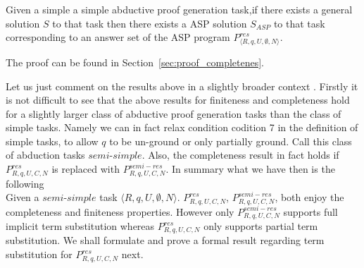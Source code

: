 
\begin{theorem}[Completeness]\label{thm:completeness}
  Given a simple a simple abductive proof generation task,if there exists a general solution $S$ to that task then there
  exists a ASP solution $S_{ASP}$ to that task corresponding to an answer set of the ASP program $P_{\langle R,q,U,\emptyset,N\rangle}^{res}$.
\end{theorem}

The proof can be found in Section~\ref{sec:proof_completenes}.

Let us just comment on the results above in a slightly broader context . Firstly it is not difficult to see that the above results for finiteness and completeness hold for a slightly larger class of abductive proof generation tasks than the class of simple tasks. Namely we can in fact relax condition codition 7 in the definition of simple tasks, to allow $q$ to be un-ground or only partially ground. Call this class of abduction tasks $semi$-$simple$.  Also, the completeness result in fact holds if $P_{R,q,U,C,N}^{res}$ is replaced with $P_{R,q,U,C,N}^{semi-res}$. In summary what we have then is the following\\
Given a $\textit{semi-simple}$ task $\langle R,q,U,\emptyset,N\rangle$. $P_{R,q,U,C,N}^{res}$, $P_{R,q,U,C,N}^{semi-res}$, both enjoy the completeness and finiteness properties. However only $P_{R,q,U,C,N}^{semi-res}$ supports full implicit term substitution whereas $P_{R,q,U,C,N}^{res}$ only supports partial term substitution. We shall formulate and prove a formal result regarding term substitution for $P_{R,q,U,C,N}^{res}$ next.    

